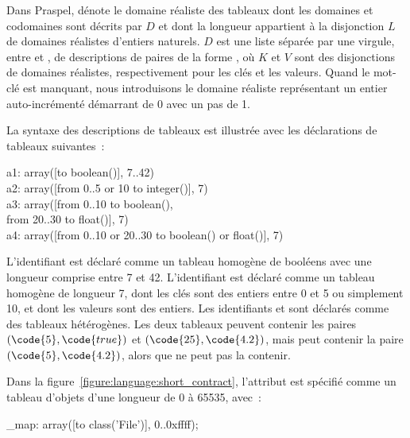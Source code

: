 Dans Praspel,  dénote le domaine réaliste des tableaux
dont les domaines et codomaines sont décrits par $D$ et dont la longueur
appartient à la disjonction $L$ de domaines réalistes d'entiers naturels.  $D$
est une liste séparée par une virgule, entre \code{[} et \code{]}, de {\strong
descriptions} de paires de la forme , où $K$ et $V$ sont
des disjonctions de domaines réalistes, respectivement pour les clés et les
valeurs. Quand le mot-clé  est manquant, nous introduisons le domaine
réaliste représentant un entier auto-incrémenté démarrant de 0 avec un pas de 1.

\begin{example}

La syntaxe des descriptions de tableaux est illustrée avec les déclarations de
tableaux suivantes~:
%
\begin{pre}
a1: array([to boolean()], 7..42) \\
a2: array([from 0..5 or 10 to integer()], 7) \\
a3: array([from 0..10 to boolean(), \\
           from 20..30 to float()], 7) \\
a4: array([from 0..10 or 20..30 to boolean() or float()], 7)
\end{pre}
%
L'identifiant  est déclaré comme un tableau homogène de booléens avec
une longueur comprise entre 7 et 42. L'identifiant  est déclaré comme
un tableau homogène de longueur 7, dont les clés sont des entiers entre 0 et 5
ou simplement 10, et dont les valeurs sont des entiers. Les identifiants
 et  sont déclarés comme des tableaux hétérogènes. Les deux
tableaux peuvent contenir les paires $(\code{5}, \code{true})$ et $(\code{25},
\code{4.2})$, mais  peut contenir la paire $(\code{5}, \code{4.2})$,
alors que  ne peut pas la contenir.

\end{example}

Dans la figure~\ref{figure:language:short_contract}, l'attribut  est
spécifié comme un tableau d'objets  d'une longueur de 0 à 65535,
avec~:
%
\begin{pre}
\ainvariant _map: array([to class('File')], 0..0xffff);
\end{pre}

